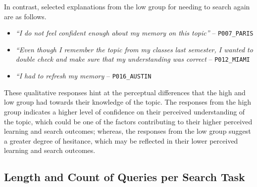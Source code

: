 \documentclass[letterpaper, nobind]{templates/ociamthesis}
\providecommand{\tightlist}{%
  \setlength{\itemsep}{0pt}\setlength{\parskip}{0pt}}
\begin{document}
In contrast, selected explanations from the low group for needing to search again are as follows.

\begin{itemize}
\tightlist
\item
  \emph{``I do not feel confident enough about my memory on this topic''} -- \texttt{P007\_PARIS}
\item
  \emph{``Even though I remember the topic from my classes last semester, I wanted to double check and make sure that my understanding was correct} -- \texttt{P012\_MIAMI}
\item
  \emph{``I had to refresh my memory} -- \texttt{P016\_AUSTIN}
\end{itemize}

These qualitative responses hint at the perceptual differences that the high and low group had towards their knowledge of the topic.
The responses from the high group indicates a higher level of confidence on their perceived understanding of the topic, which could be one of the factors contributing to their higher perceived learning and search outcomes;
whereas, the responses from the low group suggest a greater degree of hesitance, which may be reflected in their lower perceived learning and search outcomes.

\hypertarget{length-and-count-of-queries-per-search-task-1}{%
\subsection{Length and Count of Queries per Search Task}\label{length-and-count-of-queries-per-search-task-1}}
\end{document}
